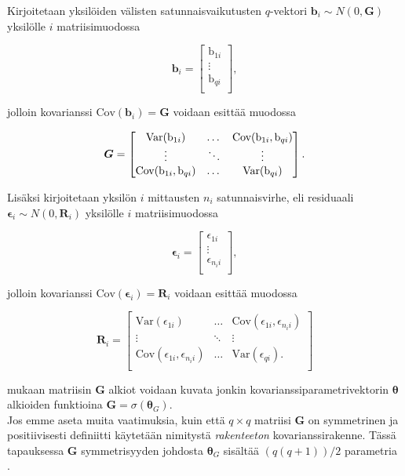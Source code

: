 \documentclass[finnish]{docopts}
\begin{document}
Kirjoitetaan yksilöiden välisten satunnaisvaikutusten $q$-vektori $\bm{b}_i \sim N(0,\bm{G})$ yksilölle $i$ matriisimuodossa

$$
\bm{b}_i =
\begin{bmatrix}
\text{b}_{1i} \\
\vdots \\
\text{b}_{qi} \\
\end{bmatrix},
$$

jolloin kovarianssi  $\text{Cov}(\bm{b}_i) = \bm{G}$ voidaan esittää muodossa

$$
\bm{G} =
\begin{bmatrix}
\text{Var}(\text{b}_{1i}) & \dots & \text{Cov}(\text{b}_{1i}, \text{b}_{qi}) \\
\vdots & \ddots & \vdots \\
\text{Cov}(\text{b}_{1i}, \text{b}_{qi}) & \dots & \text{Var}(\text{b}_{qi}) \\
\end{bmatrix}. \\
$$

Lisäksi kirjoitetaan yksilön $i$ mittausten $n_i$ satunnaisvirhe, eli residuaali $\bm{\epsilon}_i \sim N(0,\bm{R}_i)$ yksilölle $i$ matriisimuodossa

$$
\bm{\epsilon}_i =
\begin{bmatrix}
\epsilon_{1i} \\
\vdots \\
\epsilon_{n_{i}i} \\
\end{bmatrix},
$$

jolloin kovarianssi  $\text{Cov}(\bm{\epsilon}_i) = \bm{R}_i$ voidaan esittää muodossa

$$
\bm{R}_i =
\begin{bmatrix}
\text{Var}(\epsilon_{1i}) & \dots & \text{Cov}(\epsilon_{1i}, \epsilon_{n_{i}i}) \\
\vdots & \ddots & \vdots \\
\text{Cov}(\epsilon_{1i}, \epsilon_{n_{i}i}) & \dots & \text{Var}(\epsilon_{qi}). \\
\end{bmatrix}
$$

\cite{burzykowski13, west14} mukaan matriisin $\bm{G}$ alkiot voidaan kuvata jonkin kovarianssiparametrivektorin $\bm{\theta}$ alkioiden funktioina $\bm{G} = \sigma(\bm{\theta}_G)$.\\

Jos emme aseta muita vaatimuksia, kuin että $q \times q$ matriisi $\bm{G}$ on symmetrinen ja positiivisesti definiitti käytetään nimitystä \textit{rakenteeton} kovarianssirakenne. Tässä tapauksessa $\bm{G}$ symmetrisyyden johdosta $\bm{\theta}_G$ sisältää $(q(q + 1))/2$ parametria \cite{burzykowski13, west14}.\\
\end{document}
